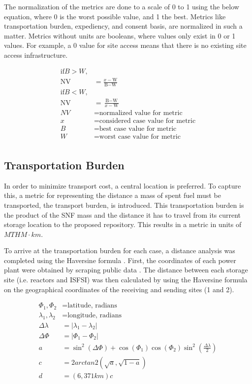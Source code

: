 The normalization of the metrics are done to a scale of 0 to 1 using the below
equation, where 0 is the worst possible value, and 1 the best. 
 Metrics like transportation burden, expediency, and consent basis,
 are normalized in such a matter. Metrics without units are booleans, where values 
 only exist in 0 or 1 values. For example, a 0 value for site access means 
that there is no existing site access infrastructure.


\begin{align} 
	\mbox{if} B>W,\\
	\mbox{NV} &= \frac{x-\mbox{W}}{\mbox{B}-\mbox{W}}\\
	\mbox{if} B<W,\\
	\mbox{NV} &= \frac{\mbox{B}-\mbox{W}}{x-\mbox{W}}\\
	NV &= \mbox{normalized value for metric}\\
	x &= \mbox{considered case value for metric}\\
	B &= \mbox{best case value for metric}\\
	W &= \mbox{worst case value for metric}\\
\end{align}



\subsection{Transportation Burden}
 In order to minimize transport cost, a central location is preferred. To 
 capture this, a metric 
 for representing the distance a mass of spent fuel must be transported, the 
 transport burden, is introduced. This transportation burden is the product 
 of the \gls{SNF} mass and the distance it has to travel from its current 
 storage location to the proposed repository. This results in a 
 metric in units of $MTHM\cdot km$. 

 To arrive at the transportation burden for each case, a distance analysis was 
 completed using the Haversine formula \cite{shumaker_astronomical_1984}. 
 First, the coordinates of each power plant were obtained by scraping public 
 data \cite{wikipedia}.  The distance between each storage site (i.e. reactors 
 and \gls{ISFSI}) was then calculated by using the Haversine formula on the 
 geographical coordinates of the receiving and sending sites (1 and 2). 

 \begin{align} 
         \Phi_1,\Phi_2&= \mbox{latitude, radians}\\
         \lambda_1,\lambda_2 &= \mbox{longitude, radians}\\
         \Delta\lambda &= \left|\lambda_1 - \lambda_2\right|\\
         \Delta\Phi &= \left|\Phi_1 - \Phi_2\right|\\
         a&=\sin^2(\Delta\Phi)+\cos(\Phi_1)\cos(\Phi_2)\sin^2{\left(\frac{\Delta\lambda}{2}\right)}\\
         c &= 2arctan2(\sqrt{a},\sqrt{1-a})\\
         d &=  (6,371km)c
 \end{align}

